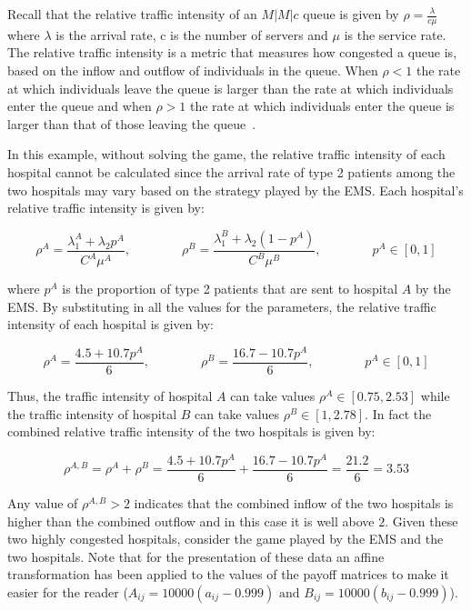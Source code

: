Recall that the relative traffic intensity of an \(M|M|c\) queue is given by
\(\rho = \frac{\lambda}{c \mu}\) where \(\lambda\) is the arrival rate, c is
the number of servers and \(\mu\) is the service rate.
The relative traffic intensity is a metric that measures how congested a queue
is, based on the inflow and outflow of individuals in the queue.
When \(\rho < 1\) the rate at which individuals leave the queue is larger than
the rate at which individuals enter
the queue and when \(\rho > 1\) the rate at which individuals enter the queue is
larger than that of those leaving the queue~\cite{almeida2018note}.

In this example, without solving the game, the relative traffic intensity of
each hospital cannot be calculated since the arrival rate of type 2 patients
among the two hospitals may vary based on the strategy played by the EMS.
Each hospital's relative traffic intensity is given by:

\begin{equation}
    \rho^A = \frac{\lambda_1^A + \lambda_2 p^A}{C^A \mu^A}, \qquad \qquad
    \rho^B = \frac{\lambda_1^B + \lambda_2 (1 - p^A)}{C^B \mu^B}, \qquad \qquad
    p^A \in [0, 1]
\end{equation}

where \(p^A\) is the proportion of type 2 patients that are sent to hospital
\(A\) by the EMS.
By substituting in all the values for the parameters, the relative traffic
intensity of each hospital is given by:

\begin{equation}
    \rho^A = \frac{4.5 + 10.7 p^A}{6}, \qquad \qquad
    \rho^B = \frac{16.7 - 10.7 p^A}{6}, \qquad \qquad
    p^A \in [0, 1]
\end{equation}

Thus, the traffic intensity of hospital \(A\) can take values \(\rho^A \in
[0.75, 2.53]\) while the traffic intensity of hospital \(B\) can take values
\(\rho^B \in [1, 2.78]\).
In fact the combined relative traffic intensity of the two hospitals is given
by:

\begin{equation}
    \rho^{A, B} = \rho^A + \rho^B = \frac{4.5 + 10.7 p^A}{6} +
    \frac{16.7 - 10.7 p^A}{6} = \frac{21.2}{6} = 3.53
\end{equation}

Any value of \(\rho^{A, B} > 2\) indicates that the combined inflow of the
two hospitals is higher than the combined outflow and in this case it is well
above \(2\).
Given these two highly congested hospitals, consider the game played by the
EMS and the two hospitals.
Note that for the presentation of these data an affine transformation has been
applied to the values of the payoff matrices to make it easier for the reader
(\(A_{ij} = 10000 (a_{ij} - 0.999) \text{ and }
B_{ij} = 10000 (b_{ij} - 0.999)\)).

